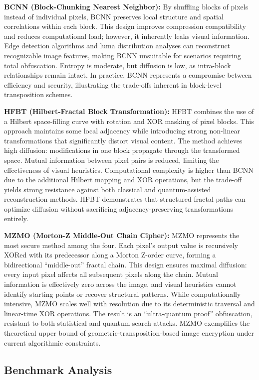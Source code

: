 \documentclass[12pt,fleqn]{article}
\begin{document}
\textbf{BCNN (Block-Chunking Nearest Neighbor):}  
By shuffling blocks of pixels instead of individual pixels, BCNN preserves local structure and spatial correlations within each block. This design improves compression compatibility and reduces computational load; however, it inherently leaks visual information. Edge detection algorithms and luma distribution analyses can reconstruct recognizable image features, making BCNN unsuitable for scenarios requiring total obfuscation. Entropy is moderate, but diffusion is low, as intra-block relationships remain intact. In practice, BCNN represents a compromise between efficiency and security, illustrating the trade-offs inherent in block-level transposition schemes.

\textbf{HFBT (Hilbert-Fractal Block Transformation):}  
HFBT combines the use of a Hilbert space-filling curve with rotation and XOR masking of pixel blocks. This approach maintains some local adjacency while introducing strong non-linear transformations that significantly distort visual content. The method achieves high diffusion: modifications in one block propagate through the transformed space. Mutual information between pixel pairs is reduced, limiting the effectiveness of visual heuristics. Computational complexity is higher than BCNN due to the additional Hilbert mapping and XOR operations, but the trade-off yields strong resistance against both classical and quantum-assisted reconstruction methods. HFBT demonstrates that structured fractal paths can optimize diffusion without sacrificing adjacency-preserving transformations entirely.

\textbf{MZMO (Morton-Z Middle-Out Chain Cipher):}  
MZMO represents the most secure method among the four. Each pixel’s output value is recursively XORed with its predecessor along a Morton Z-order curve, forming a bidirectional “middle-out” fractal chain. This design ensures maximal diffusion: every input pixel affects all subsequent pixels along the chain. Mutual information is effectively zero across the image, and visual heuristics cannot identify starting points or recover structural patterns. While computationally intensive, MZMO scales well with resolution due to its deterministic traversal and linear-time XOR operations. The result is an “ultra-quantum proof” obfuscation, resistant to both statistical and quantum search attacks. MZMO exemplifies the theoretical upper bound of geometric-transposition-based image encryption under current algorithmic constraints.

\subsection{Benchmark Analysis}
\end{document}
